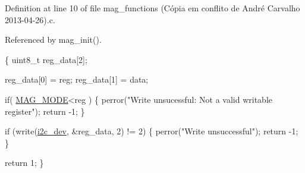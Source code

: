 Definition at line 10 of file mag\-\_\-functions (\-Cópia em conflito de André Carvalho 2013-\/04-\/26).\-c.



Referenced by mag\-\_\-init().


\begin{DoxyCode}
\{
  uint8\_t reg\_data[2];

  reg\_data[0] = reg;
  reg\_data[1] = data;

  \textcolor{keywordflow}{if}( \hyperlink{communication_2imu__regs_8h_a0173afba6efc0e164495bf506a9758d2}{MAG\_MODE}<reg )
  \{
      perror(\textcolor{stringliteral}{"Write unsucessful: Not a valid writable register"});
      \textcolor{keywordflow}{return} -1;
  \}
        
  \textcolor{keywordflow}{if} (write(\hyperlink{CommunicationV0_2communication_8c_a7751bd45ac1064efb35adf1f19c25db8}{i2c\_dev}, &reg\_data, 2) != 2) \{                
          perror(\textcolor{stringliteral}{"Write unsuccessful"});
          \textcolor{keywordflow}{return} -1;
  \}

  \textcolor{keywordflow}{return} 1;
\}
\end{DoxyCode}
